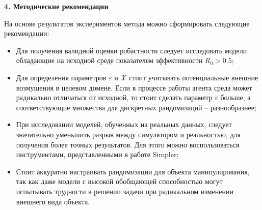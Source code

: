 \newpage
\begin{center}
  \textbf{\large 4. Методические рекомендации}
\end{center}

  На основе результатов экспериментов метода можно сформировать следующие рекомендации:

  \begin{itemize}
      \item Для получения валидной оценки робастности следует исследовать модели обладающие на исходной среде показателем эффективности $R_0 > 0.5$;

      \item Для определения параметров $\varepsilon$ и $\mathcal{X}$ стоит учитывать потенциальные внешние возмущения в целевом домене. Если в процессе работы агента среда может радикально отличаться от исходной, то стоит сделать параметр $\varepsilon$ больше, а соответствующие множества для дискретных рандомизаций -- разнообразнее; 

      \item При исследовании моделей, обученных на реальных данных, следует значительно уменьшить разрыв между симулятором и реальностью, для получения более точных результатов. Для этого можно воспользоваться инструментами, представленными в работе Simpler;

      \item Стоит аккуратно настраивать рандомизации для объекта манипулирования, так как даже модели с высокой обобщающей способностью могут испытывать трудности в решении задачи при радикальном изменении внешнего вида объекта. 
      

      
  \end{itemize}


